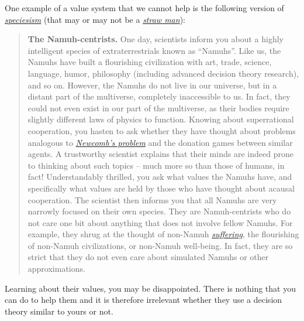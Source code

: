 One example of a value system that we cannot help is the following
version of
\href{https://en.wikipedia.org/wiki/Speciesism}{\emph{speciesism}} (that
may or may not be a
\href{https://en.wikipedia.org/wiki/Straw_man}{\emph{straw man}}):

\begin{quote}
\textbf{The Namuh-centrists.} One day, scientists inform you about a
highly intelligent species of extraterrestrials known as ``Namuhs''.
Like us, the Namuhs have built a flourishing civilization with art,
trade, science, language, humor, philosophy (including advanced decision
theory research), and so on. However, the Namuhs do not live in our
universe, but in a distant part of the multiverse, completely
inaccessible to us. In fact, they could not even exist in our part of
the multiverse, as their bodies require slightly different laws of
physics to function. Knowing about superrational cooperation, you hasten
to ask whether they have thought about problems analogous to
\href{https://en.wikipedia.org/wiki/Newcomb\%27s_paradox}{\emph{Newcomb's
problem}} and the donation games between similar agents. A trustworthy
scientist explains that their minds are indeed prone to thinking about
such topics -- much more so than those of humans, in fact!
Understandably thrilled, you ask what values the Namuhs have, and
specifically what values are held by those who have thought about
acausal cooperation. The scientist then informs you that all Namuhs are
very narrowly focused on their own species. They are Namuh-centrists who
do not care one bit about anything that does not involve fellow Namuhs.
For example, they shrug at the thought of non-Namuh
\href{https://foundational-research.org/the-case-for-suffering-focused-ethics/}{\emph{suffering}},
the flourishing of non-Namuh civilizations, or non-Namuh well-being. In
fact, they are so strict that they do not even care about simulated
Namuhs or other approximations.
\end{quote}

Learning about their values, you may be disappointed. There is nothing
that you can do to help them and it is therefore irrelevant whether they
use a decision theory similar to yours or not.

